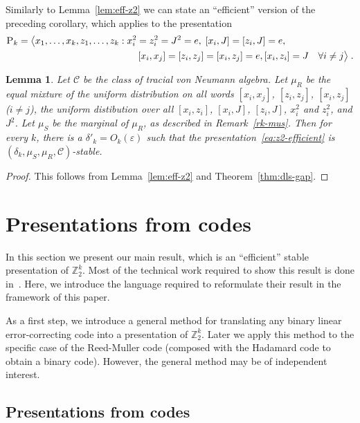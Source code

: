 \documentclass[11pt]{article}
\newtheorem{lemma}[theorem]{Lemma}
\theoremstyle{definition}
\newcommand{\Z}{\ensuremath{\mathbb{Z}}}
\newcommand{\mC}{\ensuremath{\mathcal{C}}}
\newcommand{\eps}{\varepsilon}
\newcommand{\gamestyle}[1]{\ensuremath{\textsc{#1}}\xspace}
\newcommand{\pauli}{\gamestyle{P}}
\begin{document}
Similarly to Lemma~\ref{lem:eff-z2} we can state an ``efficient'' version of the preceding corollary, which applies to the presentation
\begin{align}
 \pauli_k = \big\langle x_1,\ldots,x_k,z_1,\ldots,z_k &: x_i^2=z_i^2=J^2=e,\; [x_i,J]=[z_i,J]=e,\notag\\
&\qquad  [x_i,x_j]=[z_i,z_j]=[x_i,z_j]=e, [x_i,z_i]=J \quad \forall i\neq j \big\rangle\;.\label{eq:pauli-efficient}
\end{align}

\begin{lemma}\label{lem:eff-pauli}
  Let $\mC$ be the class of tracial von Neumann algebra. Let $\mu_R$ be the equal mixture of the uniform distribution on all words $ [x_i,x_j]$, $[z_i,z_j]$, $[x_i,z_j]$ ($i\neq j$), the uniform distibution over all $[x_i,z_i]$, $[x_i,J]$, $[z_i,J]$, $x_i^2$ and $z_i^2$, and $J^2$. Let $\mu_S$ be the marginal of $\mu_R$, as described in Remark~\ref{rk-mus}. Then 
  for every $k$, there is a $\delta'_k = O_k(\eps)$ such that the presentation~\eqref{eq:z2-efficient} is $(\delta_k,\mu_S,\mu_R,\mC)$-stable.
\end{lemma}

\begin{proof}
This follows from Lemma~\ref{lem:eff-z2} and Theorem~\ref{thm:dls-gap}.
\end{proof}

\section{Presentations from codes}
\label{sec:pres-codes}

In this section we present our main result, which is an ``efficient'' stable presentation of $\Z_2^k$. Most of the technical work required to show this result is done in~\cite{ji2020mip}. Here, we introduce the language required to reformulate their result in the framework of this paper. 

As a first step, we introduce a general method for translating any binary linear error-correcting code into a presentation of $\Z_2^k$. Later we apply this method to the specific case of the Reed-Muller code (composed with the Hadamard code to obtain a binary code). However, the general method may be of independent interest. 

\subsection{Presentations from codes}
\label{sec:pres-code}
\end{document}
